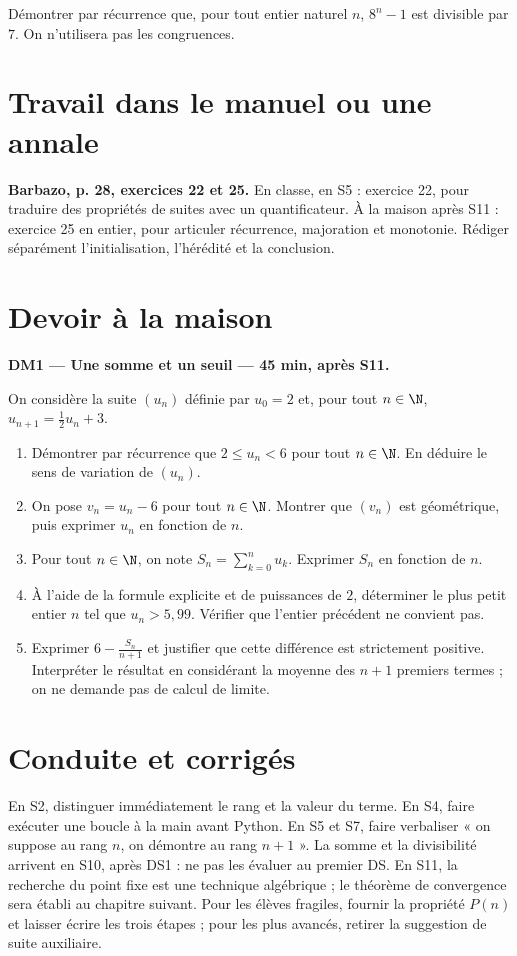 Démontrer par récurrence que, pour tout entier naturel $n$, $8^n-1$ est divisible par $7$. On n'utilisera pas les congruences.

\section{Travail dans le manuel ou une annale}\textbf{Barbazo, p. 28, exercices 22 et 25.} En classe, en S5 : exercice 22, pour traduire des propriétés de suites avec un quantificateur. À la maison après S11 : exercice 25 en entier, pour articuler récurrence, majoration et monotonie. Rédiger séparément l'initialisation, l'hérédité et la conclusion.

\section{Devoir à la maison}\textbf{DM1 --- Une somme et un seuil --- 45 min, après S11.}\par On considère la suite $(u_n)$ définie par $u_0=2$ et, pour tout $n\in\N$, $u_{n+1}=\frac12u_n+3$.
\begin{enumerate}\item Démontrer par récurrence que $2\le u_n<6$ pour tout $n\in\N$. En déduire le sens de variation de $(u_n)$.
\item On pose $v_n=u_n-6$ pour tout $n\in\N$. Montrer que $(v_n)$ est géométrique, puis exprimer $u_n$ en fonction de $n$.
\item Pour tout $n\in\N$, on note $S_n=\displaystyle\sum_{k=0}^n u_k$. Exprimer $S_n$ en fonction de $n$.
\item À l'aide de la formule explicite et de puissances de $2$, déterminer le plus petit entier $n$ tel que $u_n>5{,}99$. Vérifier que l'entier précédent ne convient pas.
\item Exprimer $6-\frac{S_n}{n+1}$ et justifier que cette différence est strictement positive. Interpréter le résultat en considérant la moyenne des $n+1$ premiers termes ; on ne demande pas de calcul de limite.\end{enumerate}

\ifmxteacher\mxnewpage\section{Conduite et corrigés}\begin{teachernote}En S2, distinguer immédiatement le rang et la valeur du terme. En S4, faire exécuter une boucle à la main avant Python. En S5 et S7, faire verbaliser « on suppose au rang $n$, on démontre au rang $n+1$ ». La somme et la divisibilité arrivent en S10, après DS1 : ne pas les évaluer au premier DS. En S11, la recherche du point fixe est une technique algébrique ; le théorème de convergence sera établi au chapitre suivant. Pour les élèves fragiles, fournir la propriété $P(n)$ et laisser écrire les trois étapes ; pour les plus avancés, retirer la suggestion de suite auxiliaire.\end{teachernote}

